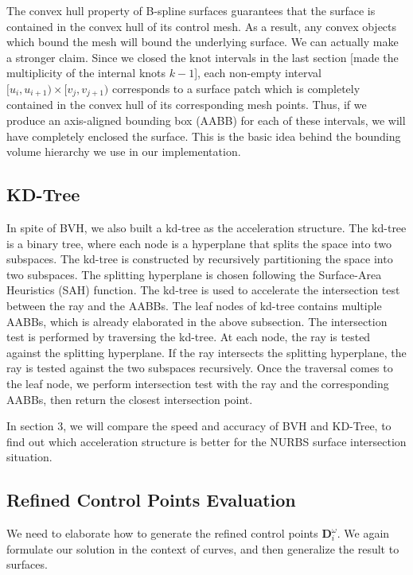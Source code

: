 \documentclass[acmtog]{acmart}
\begin{document}
The convex hull property of B-spline surfaces guarantees that the surface is contained in the convex hull of its control mesh. As a result, any convex objects which bound the mesh will bound the underlying surface. We can actually make a stronger claim. Since we closed the knot intervals in the last section [made the multiplicity of the internal knots $k-1$], each non-empty interval $[u_i,u_{i+1})\times[v_j,v_{j+1})$ corresponds to a surface patch which is completely contained in the convex hull of its corresponding mesh points. Thus, if we produce an axis-aligned bounding box (AABB) for each of these intervals, we will have completely enclosed the surface. This is the basic idea behind the bounding volume hierarchy we use in our implementation.

\subsection{KD-Tree}
\hspace*{8pt}
In spite of BVH, we also built a kd-tree as the acceleration structure. The kd-tree is a binary tree, where each node is a hyperplane that splits the space into two subspaces. The kd-tree is constructed by recursively partitioning the space into two subspaces. The splitting hyperplane is chosen following the Surface-Area Heuristics (SAH) function. The kd-tree is used to accelerate the intersection test between the ray and the AABBs. The leaf nodes of kd-tree contains multiple AABBs, which is already elaborated in the above subsection. The intersection test is performed by traversing the kd-tree. At each node, the ray is tested against the splitting hyperplane. If the ray intersects the splitting hyperplane, the ray is tested against the two subspaces recursively. Once the traversal comes to the leaf node, we perform intersection test with the ray and the corresponding AABBs, then return the closest intersection point.

In section 3, we will compare the speed and accuracy of BVH and KD-Tree, to find out which acceleration structure is better for the NURBS surface intersection situation.

\subsection{Refined Control Points Evaluation}
\hspace*{8pt}
We need to elaborate how to generate the refined control points $\mathbf{D}_i^{\omega}$. We again formulate our solution in the context of curves, and then generalize the result to surfaces.
\end{document}

